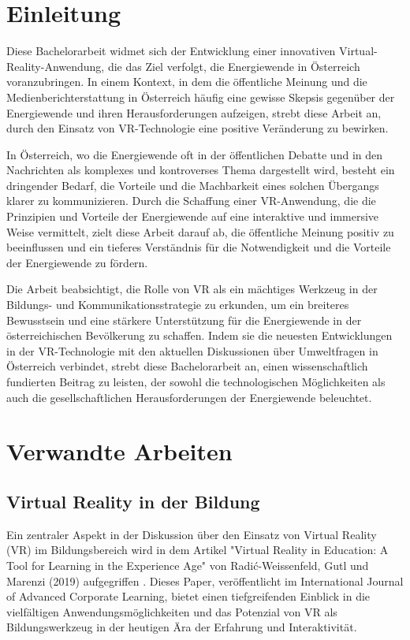 \documentclass[draft]{vutinfth} %
\begin{document}
\tableofcontents %
\mainmatter

\chapter{Einleitung}
Diese Bachelorarbeit widmet sich der Entwicklung einer innovativen Virtual-Reality-Anwendung, die das Ziel verfolgt, die Energiewende in Österreich voranzubringen. In einem Kontext, in dem die öffentliche Meinung und die Medienberichterstattung in Österreich häufig eine gewisse Skepsis gegenüber der Energiewende und ihren Herausforderungen aufzeigen, strebt diese Arbeit an, durch den Einsatz von VR-Technologie eine positive Veränderung zu bewirken.

In Österreich, wo die Energiewende oft in der öffentlichen Debatte und in den Nachrichten als komplexes und kontroverses Thema dargestellt wird, besteht ein dringender Bedarf, die Vorteile und die Machbarkeit eines solchen Übergangs klarer zu kommunizieren. Durch die Schaffung einer VR-Anwendung, die die Prinzipien und Vorteile der Energiewende auf eine interaktive und immersive Weise vermittelt, zielt diese Arbeit darauf ab, die öffentliche Meinung positiv zu beeinflussen und ein tieferes Verständnis für die Notwendigkeit und die Vorteile der Energiewende zu fördern.

Die Arbeit beabsichtigt, die Rolle von VR als ein mächtiges Werkzeug in der Bildungs- und Kommunikationsstrategie zu erkunden, um ein breiteres Bewusstsein und eine stärkere Unterstützung für die Energiewende in der österreichischen Bevölkerung zu schaffen. Indem sie die neuesten Entwicklungen in der VR-Technologie mit den aktuellen Diskussionen über Umweltfragen in Österreich verbindet, strebt diese Bachelorarbeit an, einen wissenschaftlich fundierten Beitrag zu leisten, der sowohl die technologischen Möglichkeiten als auch die gesellschaftlichen Herausforderungen der Energiewende beleuchtet.

\chapter{Verwandte Arbeiten}

\section{Virtual Reality in der Bildung}

Ein zentraler Aspekt in der Diskussion über den Einsatz von Virtual Reality (VR) im Bildungsbereich wird in dem Artikel "Virtual Reality in Education: A Tool for Learning in the Experience Age" von Radić-Weissenfeld, Gutl und Marenzi (2019) aufgegriffen \cite{hu2017virtual}. Dieses Paper, veröffentlicht im International Journal of Advanced Corporate Learning, bietet einen tiefgreifenden Einblick in die vielfältigen Anwendungsmöglichkeiten und das Potenzial von VR als Bildungswerkzeug in der heutigen Ära der Erfahrung und Interaktivität.
\end{document}
